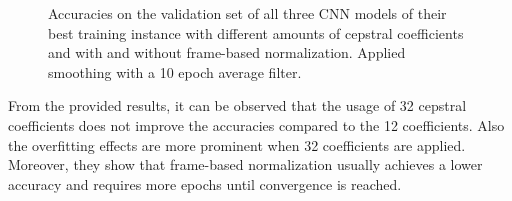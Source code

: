 \begin{figure}[!ht]
  \centering
  \caption{Accuracies on the validation set of all three CNN models of their best training instance with different amounts of cepstral coefficients and with and without frame-based normalization. Applied smoothing with a 10 epoch average filter.}
  \label{fig:exp_fs_cepstral_acc}
\end{figure}
\FloatBarrier
\noindent
From the provided results, it can be observed that the usage of 32 cepstral coefficients does not improve the accuracies compared to the 12 coefficients.
Also the overfitting effects are more prominent when 32 coefficients are applied.
Moreover, they show that frame-based normalization usually achieves a lower accuracy and requires more epochs until convergence is reached.

